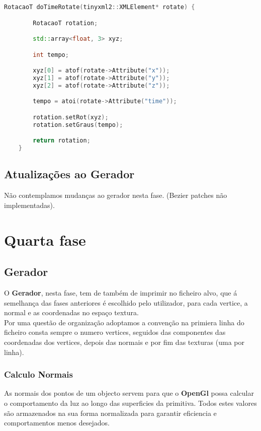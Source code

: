 \documentclass{article}
\begin{document}
\begin{file}
    \begin{lstlisting}[language=C++]
	RotacaoT doTimeRotate(tinyxml2::XMLElement* rotate) {

	    RotacaoT rotation;

	    std::array<float, 3> xyz;

	    int tempo;

	    xyz[0] = atof(rotate->Attribute("x"));
	    xyz[1] = atof(rotate->Attribute("y"));
	    xyz[2] = atof(rotate->Attribute("z"));

	    tempo = atoi(rotate->Attribute("time"));

	    rotation.setRot(xyz);
	    rotation.setGraus(tempo);

	    return rotation;
	}
    \end{lstlisting}
\end{file}

\subsection{Atualizações ao Gerador}
Não contemplamos mudanças ao gerador nesta fase. (Bezier patches não implementadas).

\newpage
\section{Quarta fase}

\subsection{Gerador}

O \textbf{Gerador}, nesta fase, tem de também de imprimir no ficheiro alvo, que á semelhança das fases anteriores é escolhido pelo utilizador, para cada vertice, a normal e as coordenadas no espaço textura.\\
Por uma questão de organização adoptamos a convenção na primiera linha do ficheiro consta sempre o numero vertices, seguidos das componentes das coordenadas dos vertices, depois das normais e por fim das texturas (uma por linha).\\
\subsubsection{ Calculo Normais }
As normais dos pontos de um objecto servem para que o \textbf{OpenGl} possa calcular o comportamento da luz ao longo das superficies da primitiva.
Todos estes valores são armazenados na sua forma normalizada para garantir eficiencia e comportamentos menos desejados.\\
\end{document}
